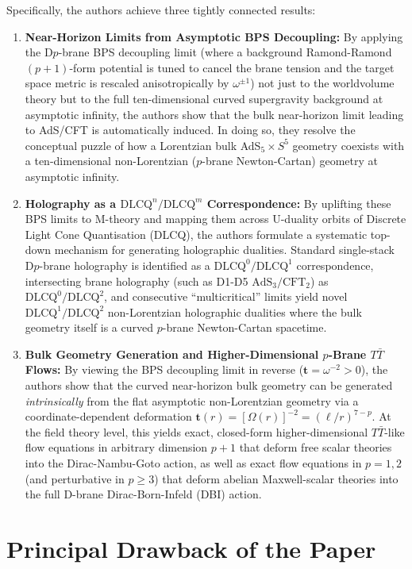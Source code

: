 \documentclass[11pt,a4paper]{article}
\begin{document}
Specifically, the authors achieve three tightly connected results:
\begin{enumerate}
    \item \textbf{Near-Horizon Limits from Asymptotic BPS Decoupling:} By applying the D$p$-brane BPS decoupling limit (where a background Ramond-Ramond $(p+1)$-form potential is tuned to cancel the brane tension and the target space metric is rescaled anisotropically by $\omega^{\pm 1}$) not just to the worldvolume theory but to the full ten-dimensional curved supergravity background at asymptotic infinity, the authors show that the bulk near-horizon limit leading to AdS/CFT is automatically induced. In doing so, they resolve the conceptual puzzle of how a Lorentzian bulk AdS${}_5 \times S^5$ geometry coexists with a ten-dimensional non-Lorentzian ($p$-brane Newton-Cartan) geometry at asymptotic infinity.
    \item \textbf{Holography as a $\text{DLCQ}^n/\text{DLCQ}^m$ Correspondence:} By uplifting these BPS limits to M-theory and mapping them across U-duality orbits of Discrete Light Cone Quantisation (DLCQ), the authors formulate a systematic top-down mechanism for generating holographic dualities. Standard single-stack D$p$-brane holography is identified as a $\text{DLCQ}^0/\text{DLCQ}^1$ correspondence, intersecting brane holography (such as D1-D5 $\text{AdS}_3/\text{CFT}_2$) as $\text{DLCQ}^0/\text{DLCQ}^2$, and consecutive ``multicritical'' limits yield novel $\text{DLCQ}^1/\text{DLCQ}^2$ non-Lorentzian holographic dualities where the bulk geometry itself is a curved $p$-brane Newton-Cartan spacetime.
    \item \textbf{Bulk Geometry Generation and Higher-Dimensional $p$-Brane $T\bar{T}$ Flows:} By viewing the BPS decoupling limit in reverse ($\boldsymbol{t} = \omega^{-2} > 0$), the authors show that the curved near-horizon bulk geometry can be generated \emph{intrinsically} from the flat asymptotic non-Lorentzian geometry via a coordinate-dependent deformation $\boldsymbol{t}(r) = [\Omega(r)]^{-2} = (\ell/r)^{7-p}$. At the field theory level, this yields exact, closed-form higher-dimensional $T\bar{T}$-like flow equations in arbitrary dimension $p+1$ that deform free scalar theories into the Dirac-Nambu-Goto action, as well as exact flow equations in $p=1, 2$ (and perturbative in $p\ge 3$) that deform abelian Maxwell-scalar theories into the full D-brane Dirac-Born-Infeld (DBI) action.
\end{enumerate}

\section{Principal Drawback of the Paper}
\end{document}
